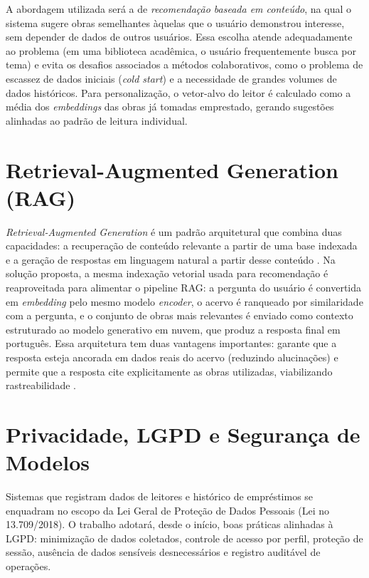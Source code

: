 \documentclass[monografia,abnt]{inf-ufg-modificado}
\begin{document}
A abordagem utilizada será a de \textit{recomendação baseada em conteúdo}, na qual o sistema sugere obras semelhantes àquelas que o usuário demonstrou interesse, sem depender de dados de outros usuários. Essa escolha atende adequadamente ao problema (em uma biblioteca acadêmica, o usuário frequentemente busca por tema) e evita os desafios associados a métodos colaborativos, como o problema de escassez de dados iniciais (\textit{cold start}) e a necessidade de grandes volumes de dados históricos. Para personalização, o vetor-alvo do leitor é calculado como a média dos \textit{embeddings} das obras já tomadas emprestado, gerando sugestões alinhadas ao padrão de leitura individual.

\section{Retrieval-Augmented Generation (RAG)}

\textit{Retrieval-Augmented Generation} é um padrão arquitetural que combina duas capacidades: a recuperação de conteúdo relevante a partir de uma base indexada e a geração de respostas em linguagem natural a partir desse conteúdo \cite{rag}. Na solução proposta, a mesma indexação vetorial usada para recomendação é reaproveitada para alimentar o pipeline RAG: a pergunta do usuário é convertida em \textit{embedding} pelo mesmo modelo \textit{encoder}, o acervo é ranqueado por similaridade com a pergunta, e o conjunto de obras mais relevantes é enviado como contexto estruturado ao modelo generativo em nuvem, que produz a resposta final em português. Essa arquitetura tem duas vantagens importantes: garante que a resposta esteja ancorada em dados reais do acervo (reduzindo alucinações) e permite que a resposta cite explicitamente as obras utilizadas, viabilizando rastreabilidade \cite{rag-survey}.

\section{Privacidade, LGPD e Segurança de Modelos}

Sistemas que registram dados de leitores e histórico de empréstimos se enquadram no escopo da Lei Geral de Proteção de Dados Pessoais (Lei no 13.709/2018). O trabalho adotará, desde o início, boas práticas alinhadas à LGPD: minimização de dados coletados, controle de acesso por perfil, proteção de sessão, ausência de dados sensíveis desnecessários e registro auditável de operações.
\end{document}
